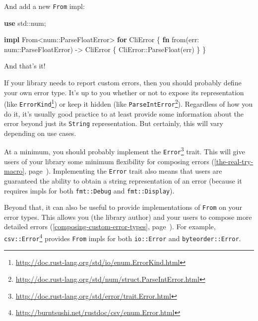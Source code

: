 \documentclass[a4paper,]{book}
\renewcommand*{\hyperref}[2][\ar]{%
  \def\ar{#2}%
  #2 (\autoref{#1}, page~\pageref{#1})}
\newenvironment{Shaded}{\begin{snugshade}}{\end{snugshade}}
\newcommand{\KeywordTok}[1]{\textcolor[rgb]{0.13,0.29,0.53}{\textbf{{#1}}}}
\newcommand{\NormalTok}[1]{{#1}}
\renewcommand{\href}[2]{#2\footnote{\url{#1}}}
\begin{document}
And add a new \texttt{From} impl:

\begin{Shaded}
\begin{Highlighting}[]

\KeywordTok{use} \NormalTok{std::num;}

\KeywordTok{impl} \NormalTok{From<num::ParseFloatError> }\KeywordTok{for} \NormalTok{CliError \{}
    \KeywordTok{fn} \NormalTok{from(err: num::ParseFloatError) -> CliError \{}
        \NormalTok{CliError::ParseFloat(err)}
    \NormalTok{\}}
\NormalTok{\}}
\end{Highlighting}
\end{Shaded}

And that's it!


If your library needs to report custom errors, then you should probably
define your own error type. It's up to you whether or not to expose its
representation (like
\href{http://doc.rust-lang.org/std/io/enum.ErrorKind.html}{\texttt{ErrorKind}})
or keep it hidden (like
\href{http://doc.rust-lang.org/std/num/struct.ParseIntError.html}{\texttt{ParseIntError}}).
Regardless of how you do it, it's usually good practice to at least
provide some information about the error beyond just its \texttt{String}
representation. But certainly, this will vary depending on use cases.

At a minimum, you should probably implement the
\href{http://doc.rust-lang.org/std/error/trait.Error.html}{\texttt{Error}}
trait. This will give users of your library some minimum flexibility for
\hyperref[the-real-try-macro]{composing errors}. Implementing the
\texttt{Error} trait also means that users are guaranteed the ability to
obtain a string representation of an error (because it requires impls
for both \texttt{fmt::Debug} and \texttt{fmt::Display}).

Beyond that, it can also be useful to provide implementations of
\texttt{From} on your error types. This allows you (the library author)
and your users to \hyperref[composing-custom-error-types]{compose more
detailed errors}. For example,
\href{http://burntsushi.net/rustdoc/csv/enum.Error.html}{\texttt{csv::Error}}
provides \texttt{From} impls for both \texttt{io::Error} and
\texttt{byteorder::Error}.
\end{document}
